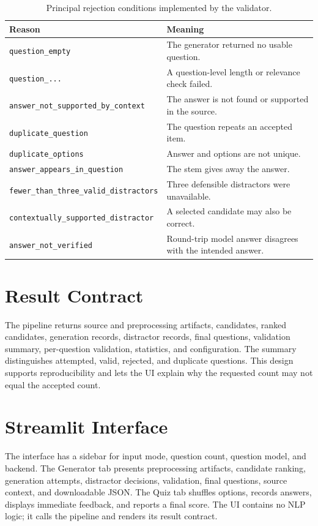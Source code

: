 \documentclass[12pt,a4paper]{report}
\newcommand{\code}[1]{\texttt{#1}}
\begin{document}
\begin{table}[H]
\centering
\caption{Principal rejection conditions implemented by the validator.}
\begin{tabular}{p{}p{}}
\toprule
\textbf{Reason} & \textbf{Meaning}\\
\midrule
\code{question\_empty} & The generator returned no usable question.\\
\code{question\_...} & A question-level length or relevance check failed.\\
\code{answer\_not\_supported\_by\_context} & The answer is not found or supported in the source.\\
\code{duplicate\_question} & The question repeats an accepted item.\\
\code{duplicate\_options} & Answer and options are not unique.\\
\code{answer\_appears\_in\_question} & The stem gives away the answer.\\
\code{fewer\_than\_three\_valid\_distractors} & Three defensible distractors were unavailable.\\
\code{contextually\_supported\_distractor} & A selected candidate may also be correct.\\
\code{answer\_not\_verified} & Round-trip model answer disagrees with the intended answer.\\
\bottomrule
\end{tabular}
\end{table}

\section{Result Contract}
The pipeline returns source and preprocessing artifacts, candidates, ranked candidates, generation records, distractor records, final questions, validation summary, per-question validation, statistics, and configuration. The summary distinguishes attempted, valid, rejected, and duplicate questions. This design supports reproducibility and lets the UI explain why the requested count may not equal the accepted count.

\section{Streamlit Interface}
The interface has a sidebar for input mode, question count, question model, and backend. The Generator tab presents preprocessing artifacts, candidate ranking, generation attempts, distractor decisions, validation, final questions, source context, and downloadable JSON. The Quiz tab shuffles options, records answers, displays immediate feedback, and reports a final score. The UI contains no NLP logic; it calls the pipeline and renders its result contract.
\end{document}
